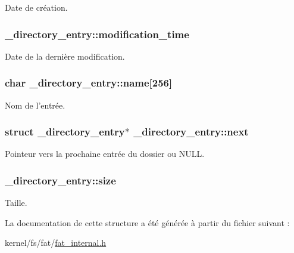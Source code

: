 Date de création. \hypertarget{struct__directory__entry_a120c3a3857bd7892a0fc2e6644e6f188}{
\subsubsection[{modification\+\_\+time}]{ \+\_\+directory\+\_\+entry\+::modification\+\_\+time}}\label{struct__directory__entry_a120c3a3857bd7892a0fc2e6644e6f188}
Date de la dernière modification. \hypertarget{struct__directory__entry_ac9142fdeb8e265f045fee1edf9608c78}{
\subsubsection[{name}]{\setlength{\rightskip}{0pt plus 5cm}char \+\_\+directory\+\_\+entry\+::name\mbox{[}256\mbox{]}}}\label{struct__directory__entry_ac9142fdeb8e265f045fee1edf9608c78}
Nom de l'entrée. \hypertarget{struct__directory__entry_a75001bda0d1d80e4ff5350ad69f83030}{
\subsubsection[{next}]{\setlength{\rightskip}{0pt plus 5cm}struct {\bf \+\_\+directory\+\_\+entry}$\ast$ \+\_\+directory\+\_\+entry\+::next}}\label{struct__directory__entry_a75001bda0d1d80e4ff5350ad69f83030}
Pointeur vers la prochaine entrée du dossier ou N\+U\+L\+L. \hypertarget{struct__directory__entry_a5d6f559c1b7ab2b5a64643073172cc25}{
\subsubsection[{size}]{ \+\_\+directory\+\_\+entry\+::size}}\label{struct__directory__entry_a5d6f559c1b7ab2b5a64643073172cc25}
Taille. 

La documentation de cette structure a été générée à partir du fichier suivant \+:\begin{DoxyCompactItemize}
\item 
kernel/fs/fat/\hyperlink{fat__internal_8h}{fat\+\_\+internal.\+h}\end{DoxyCompactItemize}
